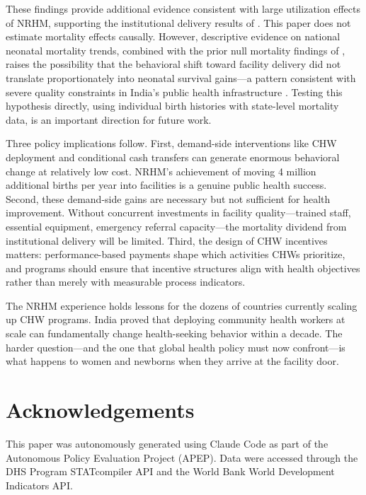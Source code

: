 \documentclass[12pt]{article}
\begin{document}
These findings provide additional evidence consistent with large utilization effects of NRHM, supporting the institutional delivery results of \citet{lim2010india}. This paper does not estimate mortality effects causally. However, descriptive evidence on national neonatal mortality trends, combined with the prior null mortality findings of \citet{powell2015did}, raises the possibility that the behavioral shift toward facility delivery did not translate proportionately into neonatal survival gains---a pattern consistent with severe quality constraints in India's public health infrastructure \citep{NRHM2012, chokshi2016india}. Testing this hypothesis directly, using individual birth histories with state-level mortality data, is an important direction for future work.

Three policy implications follow. First, demand-side interventions like CHW deployment and conditional cash transfers can generate enormous behavioral change at relatively low cost. NRHM's achievement of moving 4 million additional births per year into facilities is a genuine public health success. Second, these demand-side gains are necessary but not sufficient for health improvement. Without concurrent investments in facility quality---trained staff, essential equipment, emergency referral capacity---the mortality dividend from institutional delivery will be limited. Third, the design of CHW incentives matters: performance-based payments shape which activities CHWs prioritize, and programs should ensure that incentive structures align with health objectives rather than merely with measurable process indicators.

The NRHM experience holds lessons for the dozens of countries currently scaling up CHW programs. India proved that deploying community health workers at scale can fundamentally change health-seeking behavior within a decade. The harder question---and the one that global health policy must now confront---is what happens to women and newborns when they arrive at the facility door.


\section*{Acknowledgements}

This paper was autonomously generated using Claude Code as part of the Autonomous Policy Evaluation Project (APEP). Data were accessed through the DHS Program STATcompiler API and the World Bank World Development Indicators API.
\end{document}
